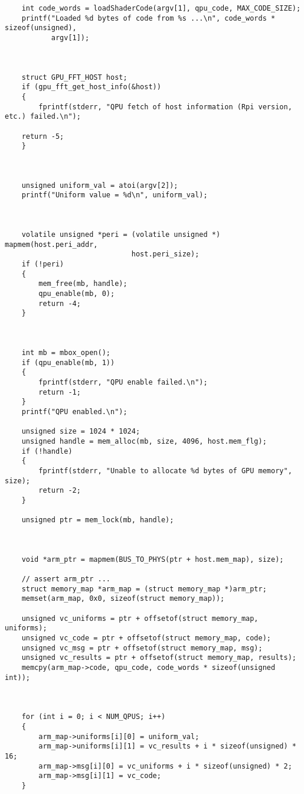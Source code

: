 \begin{lstlisting}
    int code_words = loadShaderCode(argv[1], qpu_code, MAX_CODE_SIZE);
    printf("Loaded %d bytes of code from %s ...\n", code_words * sizeof(unsigned),
           argv[1]);



    struct GPU_FFT_HOST host;
    if (gpu_fft_get_host_info(&host))
    {
        fprintf(stderr,	"QPU fetch of host information (Rpi version, etc.) failed.\n");

	return -5;
    }



    unsigned uniform_val = atoi(argv[2]);
    printf("Uniform value = %d\n", uniform_val);



    volatile unsigned *peri = (volatile unsigned *) mapmem(host.peri_addr,
                              host.peri_size);
    if (!peri)
    {
        mem_free(mb, handle);
        qpu_enable(mb, 0);
        return -4;
    }



    int mb = mbox_open();
    if (qpu_enable(mb, 1))
    {
        fprintf(stderr, "QPU enable failed.\n");
        return -1;
    }
    printf("QPU enabled.\n");

    unsigned size = 1024 * 1024;
    unsigned handle = mem_alloc(mb, size, 4096, host.mem_flg);
    if (!handle)
    {
        fprintf(stderr, "Unable to allocate %d bytes of GPU memory", size);
        return -2;
    }

    unsigned ptr = mem_lock(mb, handle);



    void *arm_ptr = mapmem(BUS_TO_PHYS(ptr + host.mem_map), size);

    // assert arm_ptr ...
    struct memory_map *arm_map = (struct memory_map *)arm_ptr;
    memset(arm_map, 0x0, sizeof(struct memory_map));

    unsigned vc_uniforms = ptr + offsetof(struct memory_map, uniforms);
    unsigned vc_code = ptr + offsetof(struct memory_map, code);
    unsigned vc_msg = ptr + offsetof(struct memory_map, msg);
    unsigned vc_results = ptr + offsetof(struct memory_map, results);
    memcpy(arm_map->code, qpu_code, code_words * sizeof(unsigned int));



    for (int i = 0; i < NUM_QPUS; i++)
    {
        arm_map->uniforms[i][0] = uniform_val;
        arm_map->uniforms[i][1] = vc_results + i * sizeof(unsigned) * 16;
        arm_map->msg[i][0] = vc_uniforms + i * sizeof(unsigned) * 2;
        arm_map->msg[i][1] = vc_code;
    }


\end{lstlisting}
